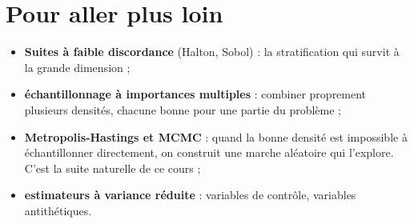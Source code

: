 \section{Pour aller plus loin}

\begin{itemize}
  \item \textbf{Suites à faible discordance} (Halton, Sobol) : la
        stratification qui survit à la grande dimension ;
  \item \textbf{échantillonnage à importances multiples} : combiner
        proprement plusieurs densités, chacune bonne pour une partie du
        problème ;
  \item \textbf{Metropolis-Hastings et MCMC} : quand la bonne densité est
        impossible à échantillonner directement, on construit une marche
        aléatoire qui l'explore. C'est la suite naturelle de ce cours ;
  \item \textbf{estimateurs à variance réduite} : variables de contrôle,
        variables antithétiques.
\end{itemize}
